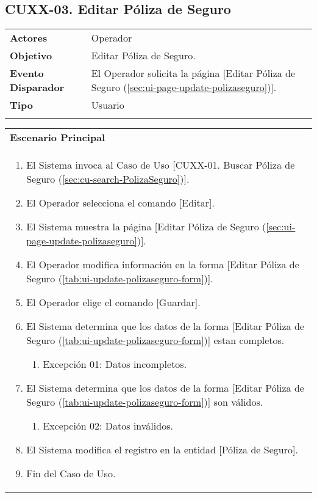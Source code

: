 \clearpage
\subsection{CUXX-03. Editar Póliza de Seguro} \label{sec:cu-update-PolizaSeguro}

\begin{tabular}{ p{3.5cm} p{11.5cm} }
	\textbf{Actores} & Operador\\
	\textbf{Objetivo} & Editar Póliza de Seguro.\\
	\textbf{Evento Disparador} & El Operador solicita la página [Editar Póliza de Seguro (\ref{sec:ui-page-update-polizaseguro})].\\
	\textbf{Tipo} & Usuario\\
	\\
\end{tabular}

\begin{tabular}{ p{15.5cm} }
	\textbf{Escenario Principal} \\
	\begin{enumerate}
		\item El Sistema invoca al Caso de Uso [CUXX-01. Buscar Póliza de Seguro (\ref{sec:cu-search-PolizaSeguro})].
		\item El Operador selecciona el comando [Editar].
		\item El Sistema muestra la página [Editar Póliza de Seguro (\ref{sec:ui-page-update-polizaseguro})].
		\item El Operador modifica información en la forma [Editar Póliza de Seguro (\ref{tab:ui-update-polizaseguro-form})].
		\item El Operador elige el comando [Guardar].
		\item El Sistema determina que los datos de la forma [Editar Póliza de Seguro (\ref{tab:ui-update-polizaseguro-form})] estan completos.
			\begin{enumerate}
				\item Excepción 01: Datos incompletos.
			\end{enumerate}
		\item El Sistema determina que los datos de la forma [Editar Póliza de Seguro (\ref{tab:ui-update-polizaseguro-form})] son válidos.
			\begin{enumerate}
				\item Excepción 02: Datos inválidos.
			\end{enumerate}
		\item El Sistema modifica el registro en la entidad [Póliza de Seguro].
		\item Fin del Caso de Uso.
	\end{enumerate}
\end{tabular}

